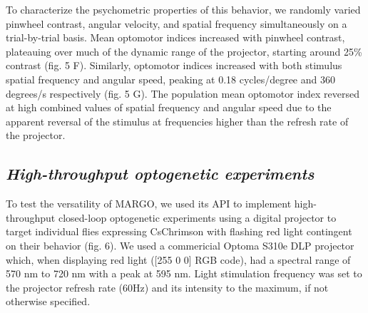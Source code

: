 \documentclass[10pt]{article}
\begin{document}
\begin{multicols}{2}
To characterize the psychometric properties of this behavior, we randomly varied pinwheel contrast, angular velocity, and spatial frequency simultaneously on a trial-by-trial basis. Mean optomotor indices increased with pinwheel contrast, plateauing over much of the dynamic range of the projector, starting around 25\% contrast (fig. 5 F). Similarly, optomotor indices increased with both stimulus spatial frequency and angular speed, peaking at 0.18 cycles/degree and 360 degrees/s respectively (fig. 5 G). The population mean optomotor index reversed at high combined values of spatial frequency and angular speed due to the apparent reversal of the stimulus at frequencies higher than the refresh rate of the projector.

\subsection*{\textit{High-throughput optogenetic experiments}}

To test the versatility of MARGO, we used its API to implement high-throughput closed-loop optogenetic experiments using a digital projector to target individual flies expressing CsChrimson \citep{griebel_2014,Klapoetke_Independent_2014} with flashing red light contingent on their behavior (fig. 6). We used a commericial Optoma S310e DLP projector which, when displaying red light ([255 0 0] RGB code), had a spectral range of 570 nm to 720 nm with a peak at 595 nm. Light stimulation frequency was set to the projector refresh rate (60Hz) and its intensity to the maximum, if not otherwise specified.


\end{multicols}
\end{document}
